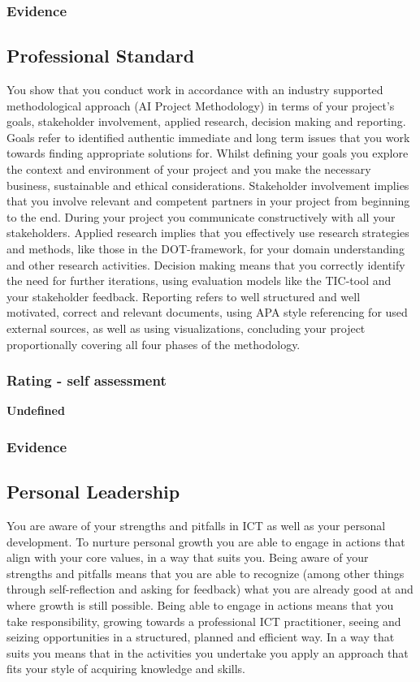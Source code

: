 \documentclass[a4paper, 11pt]{article}
\begin{document}
\subsubsection{Evidence}

\subsection{Professional Standard}
You show that you conduct work in accordance with an industry supported methodological approach (AI Project Methodology) in terms of your project's goals, stakeholder involvement, applied research, decision making and reporting.
\medbreak
Goals refer to identified authentic immediate and long term issues that you work towards finding appropriate solutions for. Whilst defining your goals you explore the context and environment of your project and you make the necessary business, sustainable and ethical considerations. Stakeholder involvement implies that you involve relevant and competent partners in your project from beginning to the end. During your project you communicate constructively with all your stakeholders. Applied research implies that you effectively use research strategies and methods, like those in the DOT-framework, for your domain understanding and other research activities. Decision making means that you correctly identify the need for further iterations, using evaluation models like the TIC-tool and your stakeholder feedback. Reporting refers to well structured and well motivated, correct and relevant documents, using APA style referencing for used external sources, as well as using visualizations, concluding your project proportionally covering all four phases of the methodology.  

\subsubsection{Rating - self assessment}
\textbf{Undefined} 
\subsubsection{Evidence} 

\subsection{Personal Leadership}
You are aware of your strengths and pitfalls in ICT as well as your personal development. To nurture personal growth you are able to engage in actions that align with your core values, in a way that suits you.
\medbreak
Being aware of your strengths and pitfalls means that you are able to recognize (among other things through self-reflection and asking for feedback) what you are already good at and where growth is still possible.   Being able to engage in actions means that you take responsibility, growing towards a professional ICT practitioner, seeing and seizing opportunities in a structured, planned and efficient way. In a way that suits you means that in the activities you undertake you apply an approach that fits your style of acquiring knowledge and skills. 
\end{document}
